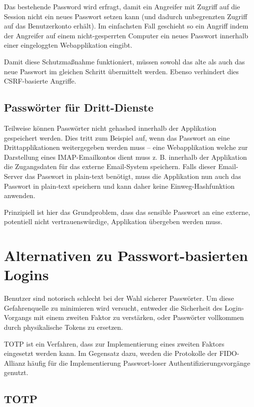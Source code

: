 Das bestehende Password wird erfragt, damit ein Angreifer mit Zugriff auf die Session nicht ein neues Passwort setzen kann (und dadurch unbegrenzten Zugriff auf das Benutzerkonto erhält). Im einfachsten Fall geschieht so ein Angriff indem der Angreifer auf einem nicht-gesperrten Computer ein neues Passwort innerhalb einer eingeloggten Webapplikation eingibt.

Damit diese Schutzmaßnahme funktioniert, müssen sowohl das alte als auch das neue Passwort im gleichen Schritt übermittelt werden. Ebenso verhindert dies CSRF-basierte Angriffe.

\subsection{Passwörter für Dritt-Dienste}

Teilweise können Passwörter nicht gehashed innerhalb der Applikation gespeichert werden. Dies tritt zum Beispiel auf, wenn das Passwort an eine Drittapplikationen weitergegeben werden muss -- eine Webapplikation welche zur Darstellung eines IMAP-Emailkontos dient muss z. B. innerhalb der Applikation die Zugangsdaten für das externe Email-System speichern. Falls dieser Email-Server das Passwort in plain-text benötigt, muss die Applikation nun auch das Passwort in plain-text speichern und kann daher keine Einweg-Hashfunktion anwenden.

Prinzipiell ist hier das Grundproblem, dass das sensible Passwort an eine externe, potentiell nicht vertrauenswürdige, Applikation übergeben werden muss.

\section{Alternativen zu Passwort-basierten Logins}

Benutzer sind notorisch schlecht bei der Wahl sicherer Passwörter. Um diese Gefahrenquelle zu minimieren wird versucht, entweder die Sicherheit des Login-Vorgangs mit einem zweiten Faktor zu verstärken, oder Passwörter vollkommen durch physikalische Tokens zu ersetzen.

TOTP ist ein Verfahren, dass zur Implementierung eines zweiten Faktors eingesetzt werden kann. Im Gegensatz dazu, werden die Protokolle der FIDO-Allianz häufig für die Implementierung Passwort-loser Authentifizierungsvorgänge genutzt.

\subsection{TOTP}

